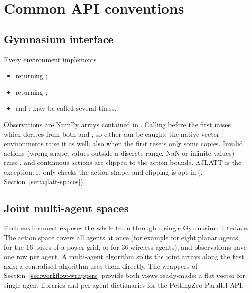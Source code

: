 \section{Common API conventions}\label{sec:envlib-api}

\subsection{Gymnasium interface}

Every environment implements
\begin{itemize}
  \item {} returning
        ;
  \item {} returning
        ;
  \item {} and ;  may be called
        several times.
\end{itemize}
Observations are  NumPy arrays contained in
. Calling  before the first
 raises , which derives from
both  and , so either can
be caught; the native vector environments raise it as well, also when the
first  resets only some copies. Invalid
actions (wrong shape, values outside a discrete range, NaN or infinite values)
raise , and continuous actions are clipped to the action
bounds. AJLATT is the exception: it only checks the action shape, and clipping
is opt-in (, Section~\ref{sec:ajlatt-spaces}).

\subsection{Joint multi-agent spaces}\label{sec:envlib-joint}

Each environment exposes the whole team through a single Gymnasium interface.
The action space covers all agents at once (for example
 for eight planar agents,
 for the 16 buses of a power grid, or
 for 36 wireless agents), and observations have
one row per agent. A multi-agent algorithm splits the joint arrays along the
first axis; a centralised algorithm uses them directly. The wrappers of
Section~\ref{sec:workflow-wrappers} provide both views ready-made: a flat
vector for single-agent libraries and per-agent dictionaries for the
PettingZoo Parallel API.


